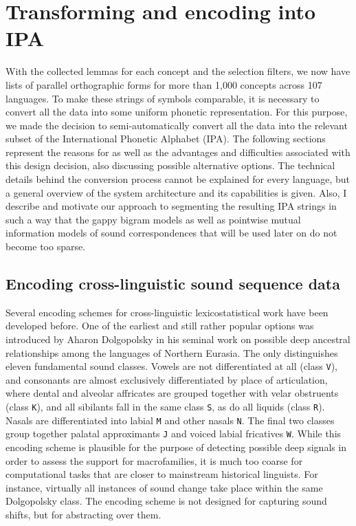 \section{Transforming and encoding into IPA}\label{sec:4.2}
With the collected lemmas for each concept and the selection filters, we now have lists of parallel orthographic forms for more than 1,000 concepts across 107 languages. To make these strings of symbols comparable, it is necessary to convert all the data into some uniform phonetic representation. For this purpose, we made the decision to semi-automatically convert all the data into the relevant subset of the International Phonetic Alphabet (IPA). The following sections represent the reasons for as well as the advantages and difficulties associated with this design decision, also discussing possible alternative options. The technical details behind the conversion process cannot be explained for every language, but a general overview of the system architecture and its capabilities is given. Also, I describe and motivate our approach to segmenting the resulting IPA strings in such a way that the gappy bigram models as well as pointwise mutual information models of sound correspondences that will be used later on do not become too sparse.

\subsection{Encoding cross-linguistic sound sequence data}
Several encoding schemes for cross-linguistic lexicostatistical work have been developed before. One of the earliest and still rather popular options was introduced by Aharon Dolgopolsky in his seminal work \citep{dolgopolsky1964} on possible deep ancestral relationships among the languages of Northern Eurasia. The  only distinguishes eleven fundamental sound classes. Vowels are not differentiated at all (class \texttt{V}), and consonants are almost exclusively differentiated by place of articulation, where dental and alveolar affricates are grouped together with velar obstruents (class \texttt{K}), and all sibilants fall in the same class \texttt{S}, as do all liquids (class \texttt{R}). Nasals are differentiated into labial \texttt{M} and other nasals \texttt{N}. The final two classes group together palatal approximants \texttt{J} and voiced labial fricatives \texttt{W}. While this encoding scheme is plausible for the purpose of detecting possible deep signals in order to assess the support for macrofamilies, it is much too coarse for computational tasks that are closer to mainstream historical linguists. For instance, virtually all instances of sound change take place within the same Dolgopolsky class. The encoding scheme is not designed for capturing sound shifts, but for abstracting over them.

